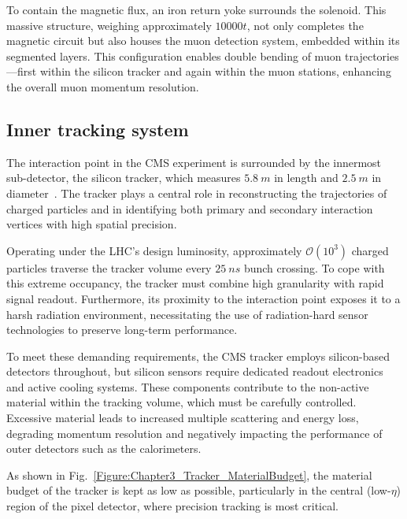 To contain the magnetic flux, an iron return yoke surrounds the solenoid. This massive structure, weighing approximately $10000\unit{t}$, not only completes the magnetic circuit but also houses the muon detection system, embedded within its segmented layers. This configuration enables double bending of muon trajectories—first within the silicon tracker and again within the muon stations, enhancing the overall muon momentum resolution.

\subsection{Inner tracking system}

The interaction point in the CMS experiment is surrounded by the innermost sub-detector, the silicon tracker, which measures $5.8~\unit{m}$ in length and $2.5~\unit{m}$ in diameter~\cite{LHC_CMS,CMS_Detector_Run3}. The tracker plays a central role in reconstructing the trajectories of charged particles and in identifying both primary and secondary interaction vertices with high spatial precision.

Operating under the LHC’s design luminosity, approximately $\mathcal{O}(10^3)$ charged particles traverse the tracker volume every $25~\unit{ns}$ bunch crossing. To cope with this extreme occupancy, the tracker must combine high granularity with rapid signal readout. Furthermore, its proximity to the interaction point exposes it to a harsh radiation environment, necessitating the use of radiation-hard sensor technologies to preserve long-term performance.

To meet these demanding requirements, the CMS tracker employs silicon-based detectors throughout, but silicon sensors require dedicated readout electronics and active cooling systems. These components contribute to the non-active material within the tracking volume, which must be carefully controlled. Excessive material leads to increased multiple scattering and energy loss, degrading momentum resolution and negatively impacting the performance of outer detectors such as the calorimeters.

As shown in Fig.~\ref{Figure:Chapter3_Tracker_MaterialBudget}, the material budget of the tracker is kept as low as possible, particularly in the central (low-$\eta$) region of the pixel detector, where precision tracking is most critical.

